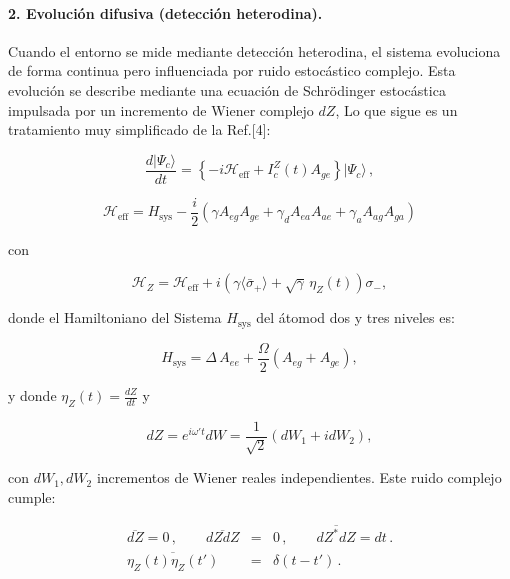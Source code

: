 \documentclass[12pt]{report}
\begin{document}
\paragraph{2. Evolución difusiva (detección heterodina).}

Cuando el entorno se mide mediante detección heterodina, el sistema evoluciona de forma continua pero influenciada por ruido estocástico complejo. Esta evolución se describe mediante una ecuación de Schrödinger estocástica impulsada por un incremento de Wiener complejo \( dZ \), Lo que sigue es un tratamiento muy simplificado de la Ref.[4]:

\begin{equation}
\frac{d |\Psi_c \rangle}{dt} = \left\{ -i \mathcal{H}_{\text{eff}} + I_c^Z(t)  A_{ge}  \right\} |\Psi_c \rangle\,,
\end{equation}
    
\begin{equation}
\mathcal{H}_{\text{eff}} = H_{\text{sys}} - \frac{i}{2} \left( \gamma A_{eg} A_{ge} + \gamma_d A_{ea} A_{ae} + \gamma_a A_{ag} A_{ga} \right)
\end{equation}

con

\begin{equation}
\mathcal{H}_Z = \mathcal{H}_{\text{eff}} + i \left( \gamma \langle \bar{\sigma}_+ \rangle + \sqrt{\gamma} \, \eta_Z(t) \right) \sigma_-,
\end{equation}

donde el Hamiltoniano del Sistema $H_{\text{sys}}$ del átomod dos y tres niveles es:

\begin{equation}
    H_{\text{sys}} = \Delta\, A_{ee} + \frac{\Omega}{2} \left( A_{eg} + A_{ge}\right),
\end{equation}

y donde \( \eta_Z(t) = \frac{dZ}{dt} \) y

\begin{equation}
dZ = e^{i\omega' t} dW = \frac{1}{\sqrt{2}} (dW_1 + i dW_2),
\end{equation}

con \( dW_1, dW_2 \) incrementos de Wiener reales independientes. Este ruido complejo cumple:

\begin{eqnarray} 	\label{eq:ComplexGaussNoise}
\overline{dZ} = 0 \,, \qquad \overline{dZdZ} &=&0  \,, 
	\qquad \overline{dZ^\ast dZ} =dt \,. 	\nonumber \\
	\overline{\eta_Z(t) \eta_Z(t')} &=& \delta(t-t') \,. 
\end{eqnarray}
\end{document}
